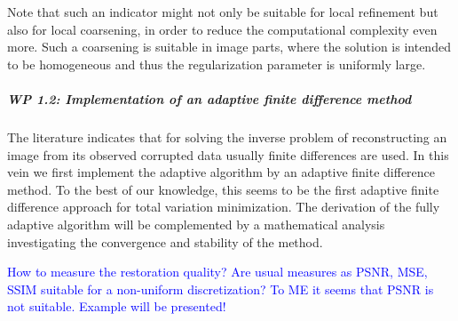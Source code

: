 \documentclass[enabledeprecatedfontcommands,cleardoublepage=empty,headsepline,twoside,11pt,DIV=15,BCOR=12mm,final]{scrartcl}
\begin{document}
Note that such an indicator might not only be suitable for local refinement but also for local coarsening, in order to reduce the computational complexity even more. Such a coarsening is suitable in image parts, where the solution is intended to be homogeneous and thus the regularization parameter is uniformly large.
 
 
 
 
 


 
 \subparagraph{WP 1.2: Implementation of an adaptive finite difference method}
 
 The literature indicates that for solving the inverse problem of reconstructing an image from its observed corrupted data usually finite differences are used. In this vein we first implement the adaptive algorithm by an adaptive finite difference method. To the best of our knowledge, this seems to be the first adaptive finite difference approach for total variation minimization. The derivation of the fully adaptive algorithm will be complemented by a mathematical analysis investigating the convergence and stability of the method. 
 
 \textcolor{blue}{How to measure the restoration quality? Are usual measures as PSNR, MSE, SSIM suitable for a non-uniform discretization? To ME it seems that PSNR is not suitable. Example will be presented!}
 
\end{document}
